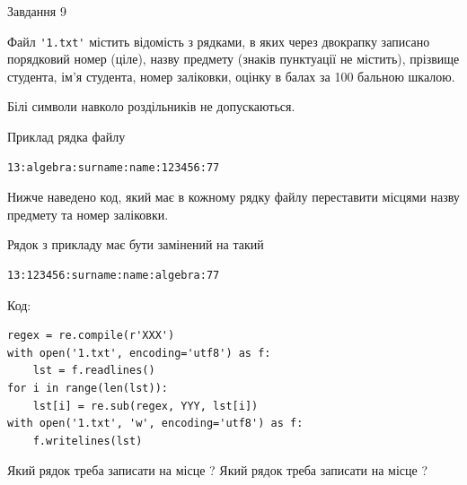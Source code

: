 \documentclass[12pt, ukrainian]{article}
\def\code#1{\Verb!#1!}
\begin{document}
{\begin{minipage}[t]{8.0cm}
\end{minipage}

               
{\begin{center}Завдання {9}\end{center}}
\vspace{-4mm}
Файл \code{'1.txt'} містить відомість з рядками, в яких через двокрапку записано поряд\-ковий номер (ціле), назву предмету (знаків пунктуації не містить), прізвище студента, ім'я студента, номер заліковки, оцінку в балах за 100 бальною шкалою.

Білі символи навколо роздільників не допускаються.

Приклад рядка файлу



\begin{verbatim}
13:algebra:surname:name:123456:77
\end{verbatim}


Нижче наведено код, який має в кожному рядку файлу переставити місцями назву предмету та номер заліковки.

Рядок з прикладу має бути замінений на такий



\begin{verbatim}
13:123456:surname:name:algebra:77
\end{verbatim}




Код:



\begin{verbatim}
regex = re.compile(r'XXX')
with open('1.txt', encoding='utf8') as f:
    lst = f.readlines()
for i in range(len(lst)):
    lst[i] = re.sub(regex, YYY, lst[i])
with open('1.txt', 'w', encoding='utf8') as f:
    f.writelines(lst)
\end{verbatim}





Який рядок треба записати на місце  ?
Який рядок треба записати на місце  ?\par

}
\newpage
\end{document}

